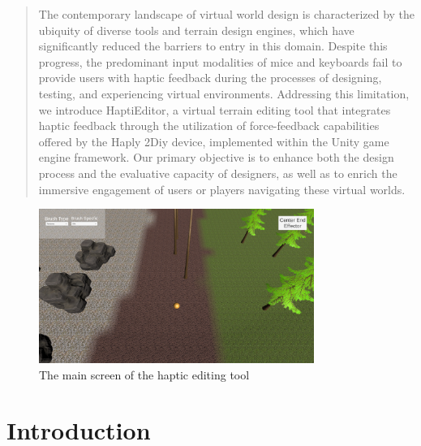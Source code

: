 \documentclass[manuscript,screen,review, nonacm=true]{acmart}
\begin{document}


\begin{abstract}
The contemporary landscape of virtual world design is characterized by the ubiquity of diverse tools and terrain design engines, which have significantly reduced the barriers to entry in this domain. Despite this progress, the predominant input modalities of mice and keyboards fail to provide users with haptic feedback during the processes of designing, testing, and experiencing virtual environments. Addressing this limitation, we introduce HaptiEditor, a virtual terrain editing tool that integrates haptic feedback through the utilization of force-feedback capabilities offered by the Haply 2Diy device, implemented within the Unity game engine framework. Our primary objective is to enhance both the design process and the evaluative capacity of designers, as well as to enrich the immersive engagement of users or players navigating these virtual worlds.  
\end{abstract}


\maketitle

\begin{figure}[hbp]
    \centering
    \includegraphics[width=0.8\textwidth]{images/approach-terrain-painter.png} 
    \caption{The main screen of the haptic editing tool}
    \label{fig:cover}
\end{figure}

\section{Introduction} \label{sec:intro}

\end{document}
